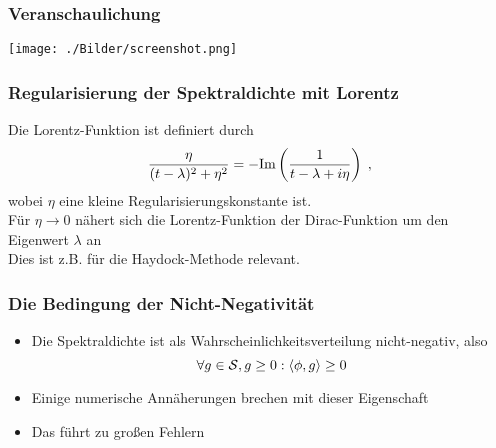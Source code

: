 \begin{frame}
    \frametitle{Veranschaulichung}
    \texttt{[image: ./Bilder/screenshot.png]}
\end{frame}

\begin{frame}
    \frametitle{Regularisierung der Spektraldichte mit Lorentz}
    Die Lorentz-Funktion ist definiert durch
    $$\frac{\eta}{(t - \lambda)^2 + \eta^2} = -\text{Im} \left( \frac{1}{t - \lambda + i \eta} \right) \; ,$$
    wobei $\eta$ eine kleine Regularisierungskonstante ist.\\
    Für $\eta \to 0$ nähert sich die Lorentz-Funktion der Dirac-Funktion um den Eigenwert $\lambda$ an\\
    Dies ist z.B. für die Haydock-Methode relevant.
\end{frame}

\begin{frame}
    \frametitle{Die Bedingung der Nicht-Negativität}
    \begin{itemize}
        \item Die Spektraldichte ist als Wahrscheinlichkeitsverteilung nicht-negativ, also
        $$\forall g \in \mathcal{S}, g \geq 0: \langle \phi, g \rangle \geq 0$$
        \item Einige numerische Annäherungen brechen mit dieser Eigenschaft
        \item Das führt zu großen Fehlern
    \end{itemize}
\end{frame}